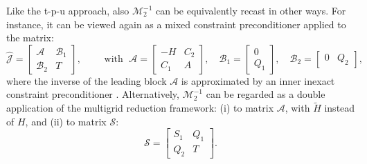 \documentclass[3p,times]{elsarticle}
\theoremstyle{plain}
\newcommand{\tH}{\widetilde{H}}
\begin{document}
\begin{rem}
Like the t-p-u approach, also $\mathcal{M}_2^{-1}$ can be equivalently recast in other ways. For instance, it can be viewed again as a mixed constraint preconditioner applied to the matrix:
\begin{equation}
    \hat{\mathcal{J}} = \left[ \begin{array}{cc}
    \mathcal{A} & \mathcal{B}_1 \\
    \mathcal{B}_2 & T \end{array} \right],
    \qquad \mbox{ with } \; \mathcal{A} = \left[ \begin{array}{cc} 
    -H & C_2 \\ C_1 & A \end{array} \right], \quad \mathcal{B}_1 = \left[ \begin{array}{c}
    0 \\ Q_1 \end{array} \right], \quad \mathcal{B}_2 = \left[ \begin{array}{cc} 0 & Q_2 \end{array} \right],
    \label{eq:22_block}
\end{equation}
where the inverse of the leading block $\mathcal{A}$ is approximated by an inner inexact constraint preconditioner \cite{Bergamaschi2007,Janna2012}. Alternatively, $\mathcal{M}_2^{-1}$ can be regarded as a double application of the multigrid reduction framework: (i) to matrix $\mathcal{A}$, with $\tH$ instead of $H$,
and (ii) to matrix $\mathcal{S}$:
\begin{equation}
    \mathcal{S} = \left[ \begin{array}{cc}
    S_1 & Q_1 \\
    Q_2 & T \end{array} \right].
    \label{eq:RP_tup2}
\end{equation}
\end{rem}
\end{document}
